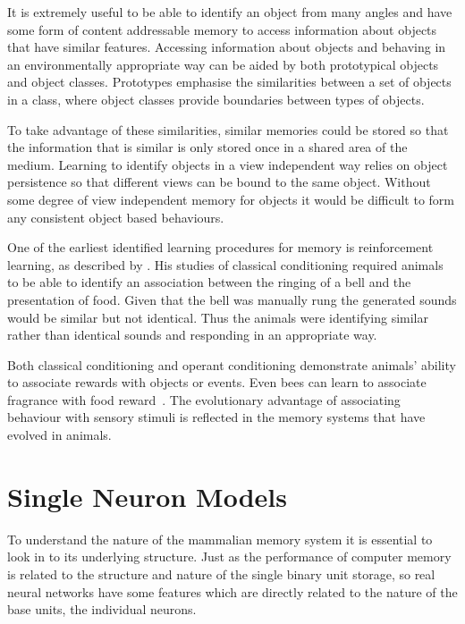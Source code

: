 It is extremely useful to be able to identify an object from many angles and have some form of content addressable memory to access information about objects that have similar features.  Accessing information about objects and behaving in an environmentally appropriate way can be aided by both prototypical objects and object classes.  Prototypes emphasise the similarities between a set of objects in a class, where object classes provide boundaries between types of objects.

To take advantage of these similarities, similar memories could be stored so that the information that is similar is only stored once in a shared area of the medium. Learning to identify objects in a view independent way relies on object persistence so that different views can be bound to the same object.  Without some degree of view independent memory for objects it would be difficult to form any consistent object based behaviours. 

One of the earliest identified learning procedures for memory is reinforcement learning, as described by \citet{Pavlov1927}. His studies of classical conditioning required animals to be able to identify an association between the ringing of a bell and the presentation of food.  Given that the bell was manually rung the generated sounds would be similar but not identical.  Thus the animals were identifying similar rather than identical sounds and responding in an appropriate way.  

Both classical conditioning and operant conditioning demonstrate animals' ability to associate rewards with objects or events.  Even bees can learn to associate fragrance with food reward~\citep{Mercer01}.  The evolutionary advantage of associating behaviour with sensory stimuli is reflected in the memory systems that have evolved in animals.

\section{Single Neuron Models}

To understand the nature of the mammalian memory system it is essential to look in to its underlying structure.  Just as the performance of computer memory is related to the structure and nature of the single binary unit storage, so real neural networks have some features which are directly related to the nature of the base units, the individual neurons.

